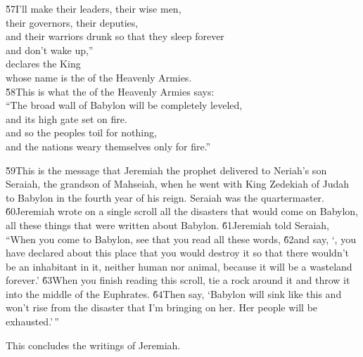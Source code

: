 \begin{poetry}
\poeml \v{57}I'll make their leaders, their wise men, \\
\poemll    their governors, their deputies, \\
\poeml and their warriors drunk so that they sleep forever \\
\poemll    and don't wake up,'' \\
\poeml declares the King \\
\poemll    whose name is the  of the Heavenly Armies. \\
\poeml \v{58}This is what the  of the Heavenly Armies says: \\
\poeml ``The broad wall of Babylon will be completely leveled, \\
\poemll    and its high gate set on fire. \\
\poeml and so the peoples toil for nothing, \\
\poemll    and the nations weary themselves only for fire.''
\end{poetry}

\v{59}This is the message that Jeremiah the prophet delivered to Neriah's son Seraiah, the grandson of Mahseiah, when he went with King Zedekiah of Judah to Babylon in the fourth year of his reign. Seraiah was the quartermaster. \v{60}Jeremiah wrote on a single scroll all the disasters that would come on Babylon, all these things that were written about Babylon. \v{61}Jeremiah told Seraiah, ``When you come to Babylon, see that you read all these words, \v{62}and say, `, you have declared about this place that you would destroy it so that there wouldn't be an inhabitant in it, neither human nor animal, because it will be a wasteland forever.' \v{63}When you finish reading this scroll, tie a rock around it and throw it into the middle of the Euphrates. \v{64}Then say, `Babylon will sink like this and won't rise from the disaster that I'm bringing on her. Her people will be exhausted.'\,''

\begin{poetry}
\poeml This concludes the writings of Jeremiah.
\end{poetry}


